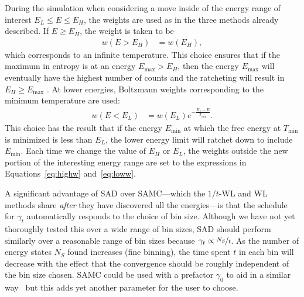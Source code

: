 \documentclass[letterpaper,twocolumn,amsmath,amssymb,pre,aps,10pt]{revtex4-1}
\begin{document}
During the simulation when considering a move inside of the energy
range of interest $E_L \le E \le E_H$, the weights are used as in the
three methods already described.  If $E\ge E_H$, the weight is taken
to be
\begin{align}\label{eq:highw}
  w(E>E_H) &= w(E_H),
\end{align}
which corresponds to an infinite temperature.  This choice ensures
that if the maximum in entropy is at an energy $E_{\max}>E_H$, then
the energy $E_{\max}$ will eventually have the highest number of
counts and the ratcheting will result in $E_H\ge E_{\max}$ .  At lower
energies, Boltzmann weights corresponding to the minimum temperature
are used:
\begin{align}\label{eq:loww}
  w(E<E_L) &= w(E_L)e^{-\frac{E_L-E}{T_{\min}}}.
\end{align}
This choice has the result that if the energy $E_{\min}$ at which the free
energy at $T_{\min}$ is minimized is less than $E_L$, the lower energy
limit will ratchet down to include $E_{\min}$.
Each time we change the value of $E_H$ or $E_L$, the weights outside the
new portion of the interesting energy range are set to the expressions
in Equations~\ref{eq:highw} and~\ref{eq:loww}.


A significant advantage of SAD over SAMC---which the $1/t$-WL and WL
methods share \emph{after} they have discovered all the energies---is that
the schedule for $\gamma_t$ automatically responds to the choice of bin
size. Although we have not yet thoroughly tested this over a wide range of bin sizes,
SAD should perform similarly over a reasonable range of bin sizes
because $\gamma_t \propto \nicefrac{N_S}{t}$.  As the number of energy
states $N_S$ found increases (fine binning), the time spent $t$ in
each bin will decrease with the effect that the convergence should be
roughly independent of the bin size chosen.  SAMC could be used with a
prefactor $\gamma_0$ to aid in a similar
way~\cite{werlich2015stochastic} but this adds yet another parameter
for the user to choose.
\end{document}
